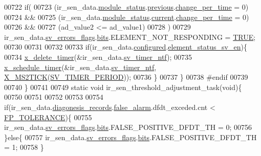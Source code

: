 \begin{DoxyCode}
00722     \textcolor{keywordflow}{if}(
00723       (ir\_sen\_data.\hyperlink{a00023_a5a53c391562b059eb744ac679f3765ca}{module\_status}.\hyperlink{a00017_a0fc6d9ce6203a17f672c19d3d8747aee}{previous}.\hyperlink{a00017_ad5c4f9a39d2a36632a53205ae8eb5a5d}{change\_per\_time} = 0)
00724       &&
00725       (ir\_sen\_data.\hyperlink{a00023_a5a53c391562b059eb744ac679f3765ca}{module\_status}.\hyperlink{a00017_ab8af48cdbba92b3ae39c4470e53af944}{current}.\hyperlink{a00017_ad5c4f9a39d2a36632a53205ae8eb5a5d}{change\_per\_time} = 0)
00726       &&
00727       (ad\_value2 <= ad\_value1)
00728       )
00729         ir\_sen\_data.\hyperlink{a00023_aaeec6b0609dba31393f337abf1cce3d3}{sv\_errors\_flags}.\hyperlink{a00022_ab81eb6fb4f1351ed07b4d6c4dd6f1959}{bits}.ELEMENT\_NOT\_RESPONDING = 
      \hyperlink{a00040_aa8cecfc5c5c054d2875c03e77b7be15d}{TRUE};
00730 
00731 
00732 
00733     \textcolor{keywordflow}{if}(ir\_sen\_data.\hyperlink{a00023_a94b2d1f6ea4ab334c74d24984dd27843}{configured}.\hyperlink{a00021_afeb3f74725269028a60926f98890c22b}{element\_status\_sv\_en})\{
00734     \hyperlink{a00036_ab69e9af4cfa717e870d587906283635c}{x\_delete\_timer}(&ir\_sen\_data.\hyperlink{a00023_ada91b200053f2d93e3639dc4ee3415b4}{sv\_timer\_ntf});
00735     \hyperlink{a00036_a9e3befaa21e83f196f74201deed85346}{x\_schedule\_timer}(&ir\_sen\_data.\hyperlink{a00023_ada91b200053f2d93e3639dc4ee3415b4}{sv\_timer\_ntf},
      \hyperlink{a00036_a1732cd929c486b3a225824bb2b3dba36}{X\_MS2TICK}(\hyperlink{a00023_a8a535456285f4602701c814d7b69cc68}{SV\_TIMER\_PERIOD}));
00736     \}
00737     \}
00738 \textcolor{preprocessor}{#endif}
00739 
00740 \}
00741 
00749  \textcolor{keyword}{static} \textcolor{keywordtype}{void} ir\_sen\_threshold\_adjustment\_task(\textcolor{keywordtype}{void})\{
00750 
00751 
00752 
00753 
00754                 \textcolor{keywordflow}{if}(ir\_sen\_data.\hyperlink{a00023_a7ae905b560513ad201e58c2f63375030}{diagonesis\_records}.\hyperlink{a00017_a799f50625c0c03f9404a59287810113d}{false\_alarm}.dfdt\_exceded.cnt
       < \hyperlink{a00017_a946f0acff4fd16a65859479e9e0b9513}{FP\_TOLERANCE})\{
00755                      ir\_sen\_data.\hyperlink{a00023_aaeec6b0609dba31393f337abf1cce3d3}{sv\_errors\_flags}.\hyperlink{a00022_ab81eb6fb4f1351ed07b4d6c4dd6f1959}{bits}.FALSE\_POSITIVE\_DFDT\_TH        = 0;
00756                 \}\textcolor{keywordflow}{else}\{
00757                      ir\_sen\_data.\hyperlink{a00023_aaeec6b0609dba31393f337abf1cce3d3}{sv\_errors\_flags}.\hyperlink{a00022_ab81eb6fb4f1351ed07b4d6c4dd6f1959}{bits}.FALSE\_POSITIVE\_DFDT\_TH        = 1;
00758                 \}

\end{DoxyCode}
